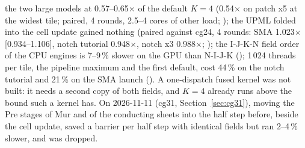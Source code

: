\begin{itemize}
  the two large models at 0.57--0.65$\times$ of the default $K=4$ (0.54$\times$ on patch x5 at the widest tile; paired,
  4 rounds, 2.5--4 cores of other load; ); the UPML folded into the cell
  update gained nothing (paired against cg24, 4 rounds: SMA 1.023$\times$ [0.934--1.106], notch tutorial 0.948$\times$,
  notch x3 0.988$\times$; ); the I-J-K-N field order of the
  CPU engines is 7--9\,\% slower on the GPU than N-I-J-K (); 1\,024
  threads per tile, the pipeline maximum and the first default, cost 44\,\% on the notch tutorial and 21\,\% on the
  SMA launch (). A one-dispatch fused kernel was not built: it
  needs a second copy of both fields, and $K=4$ already runs above the bound such a kernel has. On 2026-11-11 (cg31,
  Section~\ref{sec:cg31}), moving the Pre stages of Mur and of the conducting sheets into the half step before,
  beside the cell update, saved a barrier per half step with identical fields but ran 2--4\,\% slower, and was
  dropped.
\end{itemize}

